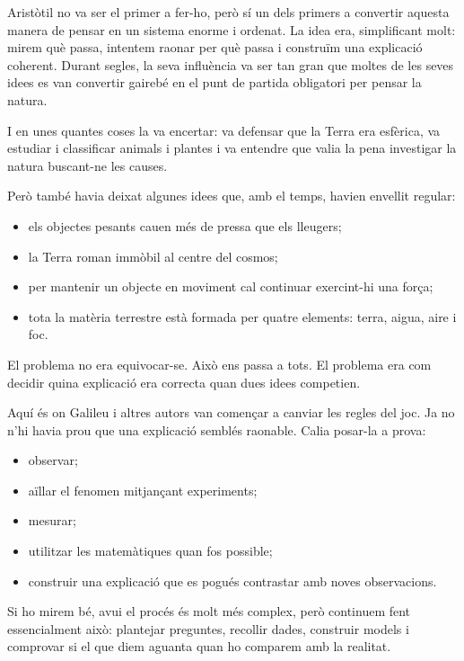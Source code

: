 Aristòtil no va ser el primer a fer-ho, però sí un dels primers a convertir aquesta manera de pensar en un sistema enorme i ordenat. La idea era, simplificant molt: mirem què passa, intentem raonar per què passa i construïm una explicació coherent. Durant segles, la seva influència va ser tan gran que moltes de les seves idees es van convertir gairebé en el punt de partida obligatori per pensar la natura.

I en unes quantes coses la va encertar: va defensar que la Terra era esfèrica, va estudiar i classificar animals i plantes i va entendre que valia la pena investigar la natura buscant-ne les causes.

Però també havia deixat algunes idees que, amb el temps, havien envellit regular:

\begin{itemize}
    \item els objectes pesants cauen més de pressa que els lleugers;
    \item la Terra roman immòbil al centre del cosmos;
    \item per mantenir un objecte en moviment cal continuar exercint-hi una força;
    \item tota la matèria terrestre està formada per quatre elements: terra, aigua, aire i foc.
\end{itemize}
El problema no era equivocar-se. Això ens passa a tots. El problema era com decidir quina explicació era correcta quan dues idees competien.

Aquí és on Galileu i altres autors van començar a canviar les regles del joc. Ja no n’hi havia prou que una explicació semblés raonable. Calia posar-la a prova:

\begin{itemize}
    \item observar;
    \item aïllar el fenomen mitjançant experiments;
    \item mesurar;
    \item utilitzar les matemàtiques quan fos possible;
    \item construir una explicació que es pogués contrastar amb noves observacions.
\end{itemize}

Si ho mirem bé, avui el procés és molt més complex, però continuem fent essencialment això: plantejar preguntes, recollir dades, construir models i comprovar si el que diem aguanta quan ho comparem amb la realitat.

